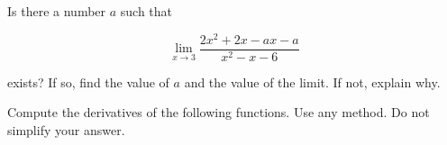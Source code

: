 \documentclass[addpoints,12pt]{exam}
\begin{document}
\begin{questions}

\newpage

\question[7]

Is there a number $a$ such that

$$\lim_{x \to 3} \dfrac{2x^2 +2x-ax-a}{x^2-x-6}$$

exists? If so, find the value of $a$ and the value of the limit. If not, explain why.

\newpage











\newpage




\question Compute the derivatives of the following functions. Use any method. Do not simplify
your answer.

\end{questions}
\end{document}

